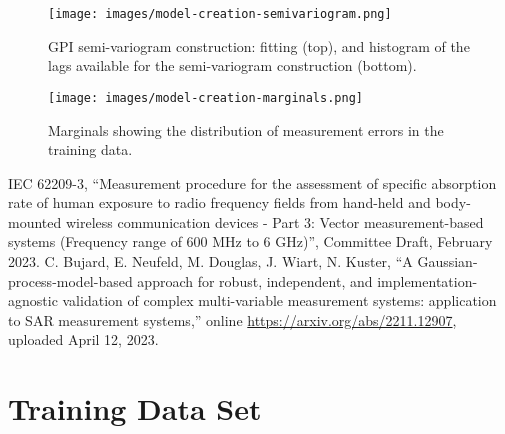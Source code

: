 \documentclass{article}
\begin{document}



\begin{figure} \centering
\texttt{[image: images/model-creation-semivariogram.png]}
\caption{GPI semi-variogram construction: fitting (top), and histogram of the lags available for the semi-variogram construction (bottom).} \label{fig:creation-variogram}
\end{figure}

\begin{figure} \centering
\texttt{[image: images/model-creation-marginals.png]}
\caption{Marginals showing the distribution of measurement errors in the training data.} \label{fig:creation-marginals}
\end{figure}

\FloatBarrier
\begin{thebibliography}{9}
IEC 62209-3, ``Measurement procedure for the assessment of specific absorption rate of human exposure to radio frequency fields from hand-held and body-mounted wireless communication devices - Part 3: Vector measurement-based systems (Frequency range of 600 MHz to 6 GHz)'', Committee Draft, February 2023.
C. Bujard, E. Neufeld, M. Douglas, J. Wiart, N. Kuster, ``A Gaussian-process-model-based approach for robust, independent, and implementation-agnostic validation of complex multi-variable measurement systems: application to SAR measurement systems,'' online \url{https://arxiv.org/abs/2211.12907}, uploaded April 12, 2023.
\end{thebibliography}

\FloatBarrier
\appendix
\section{Training Data Set} \label{sec:training-data}


\end{document}
